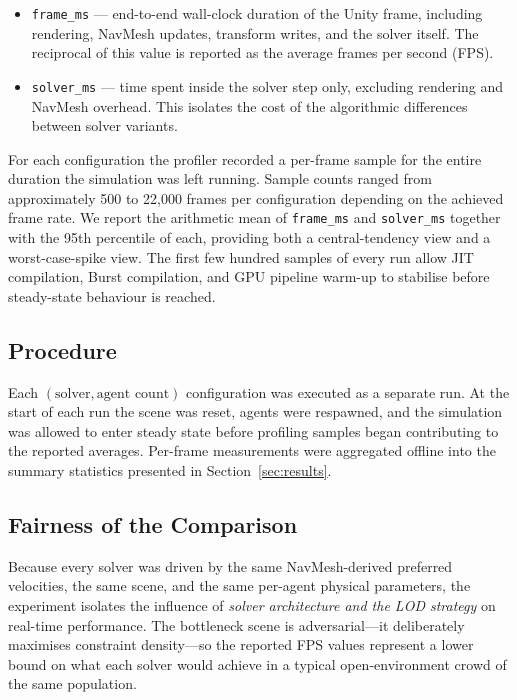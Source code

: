 \begin{itemize}[topsep=2pt,itemsep=2pt]
    \item \texttt{frame\_ms} --- end-to-end wall-clock duration of the
    Unity frame, including rendering, NavMesh updates, transform
    writes, and the solver itself.  The reciprocal of this value is
    reported as the average frames per second (FPS).
    \item \texttt{solver\_ms} --- time spent inside the solver step
    only, excluding rendering and NavMesh overhead.  This isolates the
    cost of the algorithmic differences between solver variants.
\end{itemize}

For each configuration the profiler recorded a per-frame sample for
the entire duration the simulation was left running.  Sample counts
ranged from approximately 500 to 22,000 frames per configuration
depending on the achieved frame rate.  We report the arithmetic mean
of \texttt{frame\_ms} and \texttt{solver\_ms} together with the 95th
percentile of each, providing both a central-tendency view and a
worst-case-spike view.  The first few hundred samples of every run
allow JIT compilation, Burst compilation, and GPU pipeline warm-up to
stabilise before steady-state behaviour is reached.

\subsection{Procedure}

Each $(\text{solver},\text{agent count})$ configuration was executed as
a separate run.  At the start of each run the scene was reset, agents
were respawned, and the simulation was allowed to enter steady state
before profiling samples began contributing to the reported averages.
Per-frame measurements were aggregated offline into the summary
statistics presented in Section~\ref{sec:results}.

\subsection{Fairness of the Comparison}

Because every solver was driven by the same NavMesh-derived preferred
velocities, the same scene, and the same per-agent physical parameters,
the experiment isolates the influence of \emph{solver architecture and
the LOD strategy} on real-time performance.  The bottleneck scene is
adversarial---it deliberately maximises constraint density---so the
reported FPS values represent a lower bound on what each solver would
achieve in a typical open-environment crowd of the same population.

